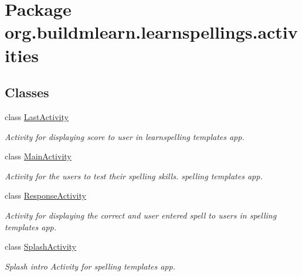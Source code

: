 \hypertarget{namespaceorg_1_1buildmlearn_1_1learnspellings_1_1activities}{}\section{Package org.\+buildmlearn.\+learnspellings.\+activities}
\label{namespaceorg_1_1buildmlearn_1_1learnspellings_1_1activities}
\subsection*{Classes}
\begin{DoxyCompactItemize}
\item 
class \hyperlink{classorg_1_1buildmlearn_1_1learnspellings_1_1activities_1_1LastActivity}{Last\+Activity}
\begin{DoxyCompactList}\small\item\em Activity for displaying score to user in learnspelling template\textquotesingle{}s app. \end{DoxyCompactList}\item 
class \hyperlink{classorg_1_1buildmlearn_1_1learnspellings_1_1activities_1_1MainActivity}{Main\+Activity}
\begin{DoxyCompactList}\small\item\em Activity for the users to test their spelling skills. spelling template\textquotesingle{}s app. \end{DoxyCompactList}\item 
class \hyperlink{classorg_1_1buildmlearn_1_1learnspellings_1_1activities_1_1ResponseActivity}{Response\+Activity}
\begin{DoxyCompactList}\small\item\em Activity for displaying the correct and user entered spell to users in spelling template\textquotesingle{}s app. \end{DoxyCompactList}\item 
class \hyperlink{classorg_1_1buildmlearn_1_1learnspellings_1_1activities_1_1SplashActivity}{Splash\+Activity}
\begin{DoxyCompactList}\small\item\em Splash intro Activity for spelling template\textquotesingle{}s app. \end{DoxyCompactList}\end{DoxyCompactItemize}
